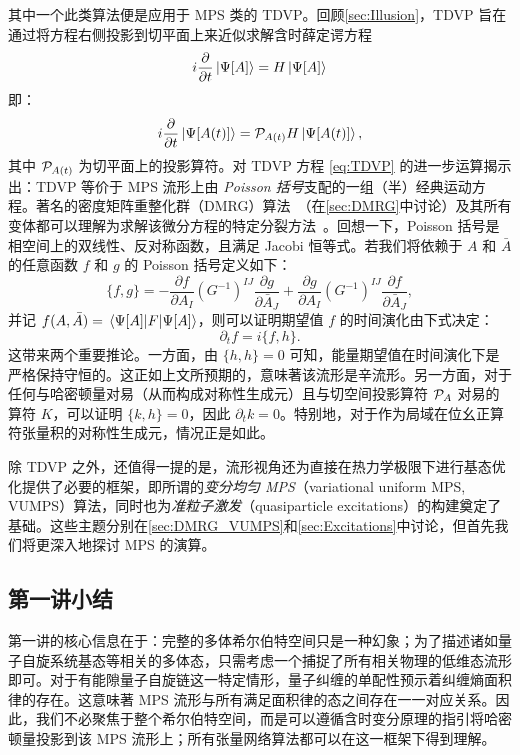 其中一个此类算法便是应用于 MPS 类的 TDVP。回顾\cref{sec:Illusion}，TDVP 旨在通过将方程右侧投影到切平面上来近似求解含时薛定谔方程
\begin{equation}
    i\pdv{t}\ket{\Psi[A]} = H \ket{\Psi[A]}
\end{equation}
即：
\begin{equation}\label{eq:TDVP}
    i\pdv{t}\ket{\Psi[A(t)]} = \mathcal P_{A(t)}H \ket{\Psi[A(t)]},
\end{equation}
其中 $\mathcal P_{A(t)}$ 为切平面上的投影算符。对 TDVP 方程 \cref{eq:TDVP} 的进一步运算揭示出：TDVP 等价于 MPS 流形上由 \emph{Poisson 括号}支配的一组（半）经典运动方程。著名的密度矩阵重整化群（DMRG）算法~\cite{White1992}（在\cref{sec:DMRG}中讨论）及其所有变体都可以理解为求解该微分方程的特定分裂方法~\cite{Haegeman2016b}。回想一下，Poisson 括号是相空间上的双线性、反对称函数，且满足 Jacobi 恒等式。若我们将依赖于 $A$ 和 $\bar A$ 的任意函数 $f$ 和 $g$ 的 Poisson 括号定义如下：
\begin{equation}
    \{f,g\} = - \frac{\partial f}{\partial A_I} (G^{-1})^{IJ} \frac{\partial g}{\partial \bar A_J} + \frac{\partial g}{\partial A_I} (G^{-1})^{IJ} \frac{\partial f}{\partial \bar A_J},
\end{equation}
并记 $f(A,\bar A)=\expval{F}{\Psi[A]}$，则可以证明期望值 $f$ 的时间演化由下式决定：
\begin{equation}
    \partial_t f = i\{f,h\}.
\end{equation}
这带来两个重要推论。一方面，由 $\{h,h\}=0$ 可知，能量期望值在时间演化下是严格保持守恒的。这正如上文所预期的，意味著该流形是辛流形。另一方面，对于任何与哈密顿量对易（从而构成对称性生成元）且与切空间投影算符 $\mathcal P_A$ 对易的算符 $K$，可以证明 $\{k,h\}=0$，因此 $\partial_t k=0$。特别地，对于作为局域在位幺正算符张量积的对称性生成元，情况正是如此。

除 TDVP 之外，还值得一提的是，流形视角还为直接在热力学极限下进行基态优化提供了必要的框架，即所谓的\emph{变分均匀 MPS}（variational uniform MPS, VUMPS）算法，同时也为\emph{准粒子激发}（quasiparticle excitations）的构建奠定了基础。这些主题分别在\cref{sec:DMRG_VUMPS}和\cref{sec:Excitations}中讨论，但首先我们将更深入地探讨 MPS 的演算。
\subsection{第一讲小结}
第一讲的核心信息在于：完整的多体希尔伯特空间只是一种幻象；为了描述诸如量子自旋系统基态等相关的多体态，只需考虑一个捕捉了所有相关物理的低维态流形即可。对于有能隙量子自旋链这一特定情形，量子纠缠的单配性预示着纠缠熵面积律的存在。这意味著 MPS 流形与所有满足面积律的态之间存在一一对应关系。因此，我们不必聚焦于整个希尔伯特空间，而是可以遵循含时变分原理的指引将哈密顿量投影到该 MPS 流形上；所有张量网络算法都可以在这一框架下得到理解。